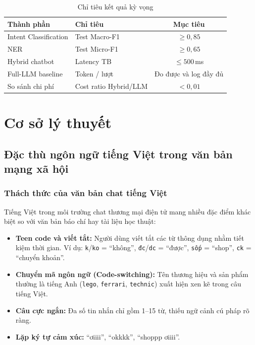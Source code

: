 \documentclass[12pt, a4paper]{report}
\begin{document}
\begin{table}[H]
\centering
\caption{Chỉ tiêu kết quả kỳ vọng}
\label{tab:expected_outcome}
\begin{tabular}{llc}
\toprule
\textbf{Thành phần} & \textbf{Chỉ tiêu} & \textbf{Mục tiêu} \\
\midrule
Intent Classification & Test Macro-F1     & $\geq 0{,}85$ \\
NER                   & Test Micro-F1     & $\geq 0{,}65$ \\
Hybrid chatbot        & Latency TB        & $\leq 500$\,ms \\
Full-LLM baseline     & Token / lượt      & Đo được và log đầy đủ \\
So sánh chi phí       & Cost ratio Hybrid/LLM & $< 0{,}01$ \\
\bottomrule
\end{tabular}
\end{table}

\chapter{Cơ sở lý thuyết}

\section{Đặc thù ngôn ngữ tiếng Việt trong văn bản mạng xã hội}

\subsection{Thách thức của văn bản chat tiếng Việt}

Tiếng Việt trong môi trường chat thương mại điện tử mang nhiều đặc điểm
khác biệt so với văn bản báo chí hay tài liệu học thuật:

\begin{itemize}
  \item \textbf{Teen code và viết tắt:} Người dùng viết tắt các từ thông dụng
        nhằm tiết kiệm thời gian. Ví dụ: \texttt{k}/\texttt{ko} = ``không'',
        \texttt{đc}/\texttt{dc} = ``được'', \texttt{sốp} = ``shop'',
        \texttt{ck} = ``chuyển khoản''.
  \item \textbf{Chuyển mã ngôn ngữ (Code-switching):} Tên thương hiệu và sản phẩm
        thường là tiếng Anh (\texttt{lego}, \texttt{ferrari}, \texttt{technic})
        xuất hiện xen kẽ trong câu tiếng Việt.
  \item \textbf{Câu cực ngắn:} Đa số tin nhắn chỉ gồm 1--15 từ,
        thiếu ngữ cảnh cú pháp rõ ràng.
  \item \textbf{Lặp ký tự cảm xúc:} ``ơiiii'', ``okkkk'', ``shoppp ơiiii''.
\end{itemize}
\end{document}
